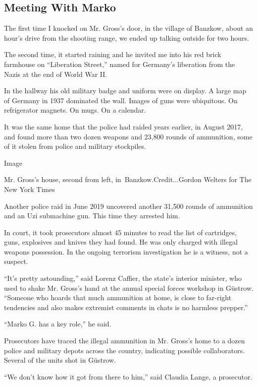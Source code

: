 \hypertarget{meeting-with-marko}{%
\subsection{Meeting With Marko}\label{meeting-with-marko}}

The first time I knocked on Mr. Gross's door, in the village of Banzkow,
about an hour's drive from the shooting range, we ended up talking
outside for two hours.

The second time, it started raining and he invited me into his red brick
farmhouse on ``Liberation Street,'' named for Germany's liberation from
the Nazis at the end of World War II.

In the hallway his old military badge and uniform were on display. A
large map of Germany in 1937 dominated the wall. Images of guns were
ubiquitous. On refrigerator magnets. On mugs. On a calendar.

It was the same home that the police had raided years earlier, in August
2017, and found more than two dozen weapons and 23,800 rounds of
ammunition, some of it stolen from police and military stockpiles.

Image

Mr. Gross's house, second from left, in~Banzkow.Credit...Gordon Welters
for The New York Times

Another police raid in June 2019 uncovered another 31,500 rounds of
ammunition and an Uzi submachine gun. This time they arrested him.

In court, it took prosecutors almost 45 minutes to read the list of
cartridges, guns, explosives and knives they had found. He was only
charged with illegal weapons possession. In the ongoing terrorism
investigation he is a witness, not a suspect.

``It's pretty astounding,'' said Lorenz Caffier, the state's interior
minister, who used to shake Mr. Gross's hand at the annual special
forces workshop in Güstrow. ``Someone who hoards that much ammunition at
home, is close to far-right tendencies and also makes extremist comments
in chats is no harmless prepper.''

``Marko G. has a key role,'' he said.

Prosecutors have traced the illegal ammunition in Mr. Gross's home to a
dozen police and military depots across the country, indicating possible
collaborators. Several of the units shot in Güstrow.

``We don't know how it got from there to him,'' said Claudia Lange, a
prosecutor.

